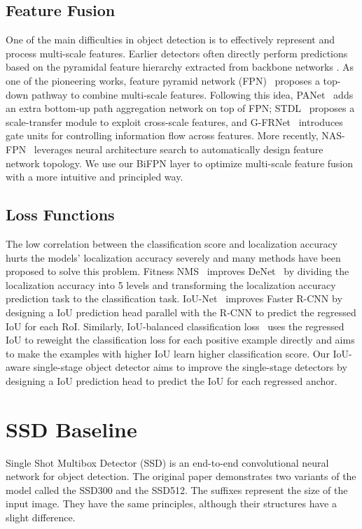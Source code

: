 \documentclass[journal,conference]{IEEEtran}
\begin{document}
\subsection{Feature Fusion}
One of the main difficulties in object detection is to effectively represent and process multi-scale features. Earlier detectors often directly perform predictions based on the pyramidal feature hierarchy extracted from backbone networks \cite{caiunified, liussd, sermanetoverfeat} . As one of the pioneering works, feature pyramid network (FPN)~\cite{linfeature2} proposes a top-down pathway to combine multi-scale features. Following this idea, PANet~\cite{liupath} adds an extra bottom-up path aggregation network on top of FPN; STDL~\cite{zhouscale} proposes a scale-transfer module to exploit cross-scale features, and G-FRNet~\cite{amirulgated} introduces gate units for controlling information flow across features. More recently, NAS-FPN~\cite{ghiasifpn} leverages neural architecture search to automatically design feature network topology. We use our BiFPN layer to optimize multi-scale feature fusion with a more intuitive and principled way.

\subsection{Loss Functions}
The low correlation between the classification score and localization accuracy hurts the models' localization accuracy severely and many methods have been proposed to solve this problem. Fitness NMS~\cite{tychsenimproving} improves DeNet~\cite{tychsendenet} by dividing the localization accuracy into 5 levels and transforming the localization accuracy prediction task to the classification task. IoU-Net~\cite{jiangacquisition} improves Faster R-CNN by designing a IoU prediction head parallel with the R-CNN to predict the regressed IoU for each RoI. Similarly, IoU-balanced classification loss~\cite{wuiou} uses the regressed IoU to reweight the classification loss for each positive example directly and aims to make the examples with higher IoU learn higher classification score. Our IoU-aware single-stage object detector aims to improve the single-stage detectors by designing a IoU prediction head to predict the IoU for each regressed anchor.



\section{SSD Baseline}
Single Shot Multibox Detector (SSD) is an end-to-end convolutional neural network for object detection. The original paper \cite{ssd} demonstrates two variants of the model called the SSD300 and the SSD512. The suffixes represent the size of the input image. They have the same principles, although their structures have a slight difference.
\end{document}
